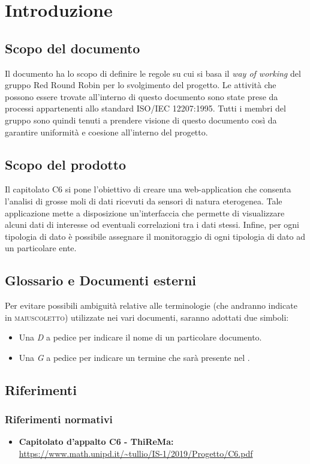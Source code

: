 \section{Introduzione}
	\subsection{Scopo del documento}
		Il documento ha lo scopo di definire le regole su cui si basa il \textit{way of working} del gruppo Red Round Robin per lo svolgimento del progetto. Le attività che possono essere trovate all'interno di questo documento sono state prese da processi appartenenti allo standard ISO/IEC 12207:1995. Tutti i membri del gruppo sono quindi tenuti a prendere visione di questo documento così da garantire uniformità e coesione all'interno del progetto.   
	\subsection{Scopo del prodotto}
		Il capitolato C6 si pone l'obiettivo di creare una web-application che consenta l'analisi di grosse moli di dati ricevuti da sensori di natura eterogenea. Tale applicazione mette a disposizione un'interfaccia che permette di visualizzare alcuni dati di interesse od eventuali correlazioni tra i dati stessi. Infine, per ogni tipologia di dato è possibile assegnare il monitoraggio di ogni tipologia di dato ad un particolare ente. 
	\subsection{Glossario e Documenti esterni}
		Per evitare possibili ambiguità relative alle terminologie (che andranno indicate in \textsc{maiuscoletto}) utilizzate nei vari documenti, saranno adottati due simboli:
		\begin{itemize}
			\item Una \textit{D} a pedice per indicare il nome di un particolare documento.
			\item Una \textit{G} a pedice per indicare un termine che sarà 
			presente nel .
		\end{itemize}
	\subsection{Riferimenti}

		\subsubsection{Riferimenti normativi}
			\begin{itemize}
				\item \textbf{Capitolato d'appalto C6 - ThiReMa: } \\
				\url{https://www.math.unipd.it/~tullio/IS-1/2019/Progetto/C6.pdf}
			\end{itemize}	
